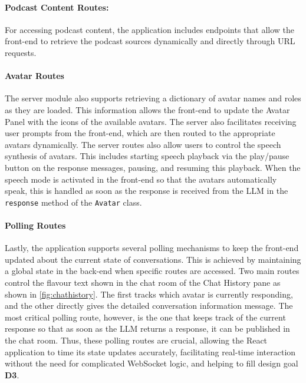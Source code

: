 \documentclass[12pt]{report}
\begin{document}
\begin{myfont}
        \paragraph{Podcast Content Routes:} For accessing podcast content, the application includes endpoints that allow the front-end to retrieve the podcast sources dynamically and directly through URL requests.
        
        \paragraph{Avatar Routes} The server module also supports retrieving a dictionary of avatar names and roles as they are loaded. This information allows the front-end to update the Avatar Panel with the icons of the available avatars. The server also facilitates receiving user prompts from the front-end, which are then routed to the appropriate avatars dynamically. The server routes also allow users to control the speech synthesis of avatars. This includes starting speech playback via the play/pause button on the response messages, pausing, and resuming this playback. When the speech mode is activated in the front-end so that the avatars automatically speak, this is handled as soon as the response is received from the LLM in the \texttt{response} method of the \texttt{Avatar} class.
        
        \paragraph{Polling Routes} Lastly, the application supports several polling mechanisms to keep the front-end updated about the current state of conversations. This is achieved by maintaining a global state in the back-end when specific routes are accessed. Two main routes control the flavour text shown in the chat room of the Chat History pane as shown in \ref{fig:chathistory}. The first tracks which avatar is currently responding, and the other directly gives the detailed conversation information message. The most critical polling route, however, is the one that keeps track of the current response so that as soon as the LLM returns a response, it can be published in the chat room. Thus, these polling routes are crucial, allowing the React application to time its state updates accurately, facilitating real-time interaction without the need for complicated WebSocket logic, and helping to fill design goal \textbf{D3}.
        

\end{myfont}
\end{document}
